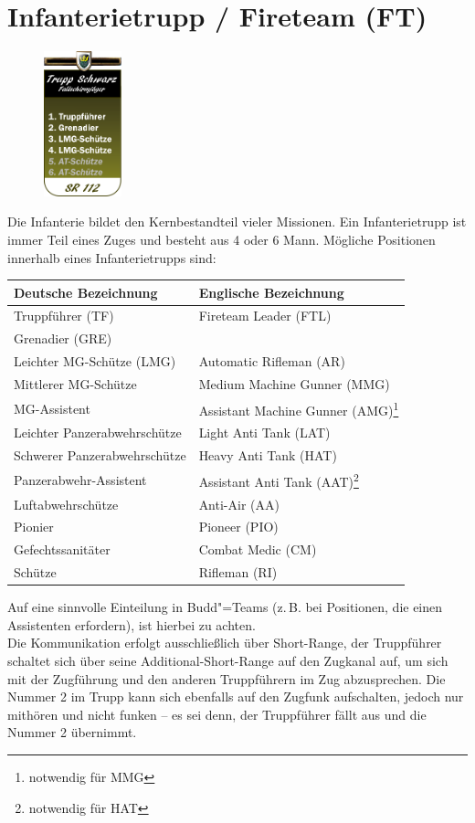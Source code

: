 \section{Infanterietrupp / Fireteam (FT)}
\begin{figure}
	\vspace{-50pt}
	\centering 
	\includegraphics[width=0.2\textwidth]{./img/truppenordnung/infanterie/infanterie}
	\vspace{-90pt}
\end{figure}
Die Infanterie bildet den Kernbestandteil vieler Missionen. Ein Infanterietrupp ist immer Teil eines Zuges und besteht aus 4 oder 6 Mann. Mögliche Positionen innerhalb eines Infanterietrupps sind:
\vspace{3.5cm}
\begin{longtable}{@{}P{0.4\textwidth}P{0.4\textwidth}@{}}
	\toprule
	Deutsche Bezeichnung & Englische Bezeichnung\\
	\midrule
	Truppführer (TF) & Fireteam Leader (FTL)\\
	Grenadier (GRE) & \\
	Leichter MG-Schütze (LMG) & Automatic Rifleman (AR)\\
	Mittlerer MG-Schütze & Medium Machine Gunner (MMG) \\
	MG-Assistent & Assistant Machine Gunner (AMG)\footnote{notwendig für MMG}\\ 
	Leichter Panzerabwehrschütze & Light Anti Tank (LAT)\\
	Schwerer Panzerabwehrschütze & Heavy Anti Tank (HAT)\\
	Panzerabwehr-Assistent & Assistant Anti Tank (AAT)\footnote{notwendig für HAT}\\ 
	Luftabwehrschütze & Anti-Air (AA)\\
	Pionier & Pioneer (PIO)\\
	Gefechtssanitäter & Combat Medic (CM)\\
	Schütze & Rifleman (RI)\\			
	\bottomrule					
\end{longtable}


Auf eine sinnvolle Einteilung in Budd"=Teams (z.\,B. bei Positionen, die einen Assistenten erfordern), ist hierbei zu achten.\\
Die Kommunikation erfolgt ausschließlich über Short-Range, der Truppführer schaltet sich über seine Additional-Short-Range auf den Zugkanal auf, um sich mit der Zugführung und den anderen Truppführern im Zug abzusprechen. Die Nummer 2 im Trupp kann sich ebenfalls auf den Zugfunk aufschalten, jedoch nur mithören und nicht funken -- es sei denn, der Truppführer fällt aus und die Nummer 2 übernimmt.